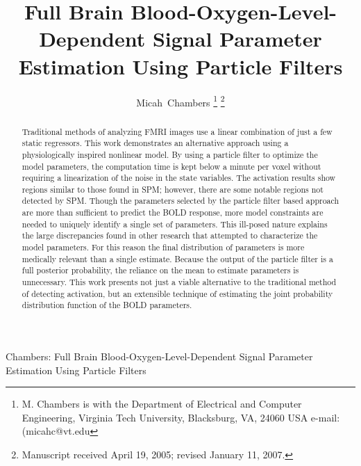 \documentclass[journal]{./IEEEtran}
\begin{document}
\title{Full Brain Blood-Oxygen-Level-Dependent Signal Parameter Estimation Using Particle Filters}

\author{{Micah~Chambers}%
\thanks{M. Chambers is with the Department
of Electrical and Computer Engineering, Virginia Tech University, Blacksburg,
VA, 24060 USA e-mail: (micahc@vt.edu}%
\thanks{Manuscript received April 19, 2005; revised January 11, 2007.}}

%
{Chambers: Full Brain Blood-Oxygen-Level-Dependent Signal Parameter Estimation Using Particle Filters}
% 

\maketitle

\begin{abstract}
Traditional methods of analyzing FMRI images use a linear combination of
just a few static regressors. This work demonstrates an alternative
approach using a physiologically inspired nonlinear model. By using a 
particle filter to optimize the model parameters, the computation time
is kept below a minute per voxel without requiring a linearization 
of the noise in the state
variables. The activation results show regions similar to those found in 
SPM; however, there are some notable regions not detected by 
SPM. Though the parameters selected by the particle filter based approach
are more than sufficient to predict the BOLD response,
more model constraints are needed to uniquely identify a single set
of parameters. This ill-posed nature explains the large discrepancies
found in other research that attempted to characterize the model parameters.
For this reason the final distribution of parameters is more medically relevant
than a single estimate. Because the output of the particle filter is 
a full posterior probability, the reliance on the mean to estimate 
parameters is unnecessary. This work presents
not just a viable alternative to the traditional method of detecting
activation, but an extensible technique of estimating the joint probability
distribution function of the BOLD parameters.
\end{abstract}
\end{document}
